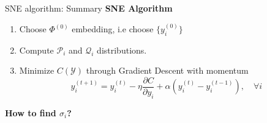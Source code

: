 \documentclass[10pt]{beamer}
\theoremstyle{definition}
\newcommand{\1}{\mathbbm{1}}
\newcommand{\YY}{\mathcal{Y}}
\newcommand{\PP}{\mathcal{P}}
\newcommand{\QQ}{\mathcal{Q}}
\begin{document}
\begin{frame}{SNE algorithm: Summary}{}
  {\bf SNE Algorithm}
  \begin{enumerate}
    \item Choose $\Phi^{(0)}$ embedding, i.e choose $\{y_i^{(0)}\}$
    \item Compute $\PP_i$ and $\QQ_i$ distributions.
    \item Minimize $C(\YY)$ through Gradient Descent with momentum 
      \[
        y_i^{(t+1)} = y_i^{(t)} - \eta \frac{\partial C}{\partial y_i} +
        \alpha \left( y_i^{(t)} - y_i^{(t-1)} \right),\quad
        \forall i
      \]
  \end{enumerate}
  \vfill
  \begin{center}
    {\bf\large How to find $\sigma_i$?}
  \end{center}
\end{frame}
\end{document}
